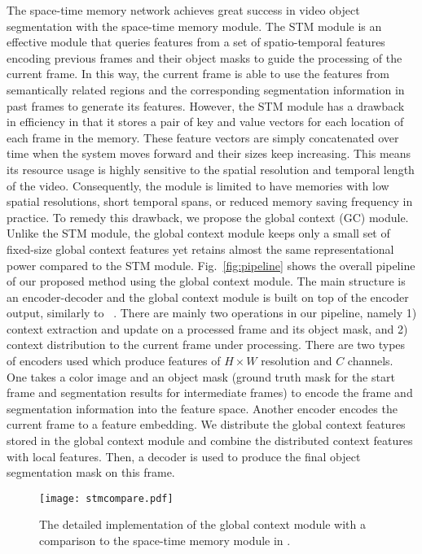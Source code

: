 \documentclass[runningheads]{llncs}
\begin{document}
The space-time memory network \cite{stm} achieves great success in video object segmentation with the space-time memory module. The STM module is an effective module that queries features from a set of spatio-temporal features encoding previous frames and their object masks to guide the processing of the current frame. In this way, the current frame is able to use the features from semantically related regions and the corresponding segmentation information in past frames to generate its features. However, the STM module has a drawback in efficiency in that it stores a pair of key and value vectors for each location of each frame in the memory. These feature vectors are simply concatenated over time when the system moves forward and their sizes keep increasing. This means its resource usage is highly sensitive to the spatial resolution and temporal length of the video. Consequently, the module is limited to have memories with low spatial resolutions, short temporal spans, or reduced memory saving frequency in practice. To remedy this drawback, we propose the global context (GC) module. Unlike the STM module, the global context module keeps only a small set of fixed-size global context features yet retains almost the same representational power compared to the STM module. Fig.~\ref{fig:pipeline} shows the overall pipeline of our proposed method using the global context module. The main structure is an encoder-decoder and the global context module is built on top of the encoder output, similarly to ~\cite{stm}.  There are mainly two operations in our pipeline, namely 1) context extraction and update on a processed frame and its object mask, and 2) context distribution to the current frame under processing. There are two types of encoders used which produce features of $ H \times W$ resolution and $C$ channels. One takes a color image and an object mask (ground truth mask for the start frame and segmentation results for intermediate frames) to encode the frame and segmentation information into the feature space. Another encoder encodes the current frame to a feature embedding. We distribute the global context features stored in the global context module and combine the distributed context features with local features. Then, a decoder is used to produce the final object segmentation mask on this frame.

\begin{figure*}[tb]
    \texttt{[image: stmcompare.pdf]}
    \caption{The detailed implementation of the global context module with a comparison to the space-time memory module in \cite{stm}.}
    \label{fig:compare}
\end{figure*}
\end{document}
